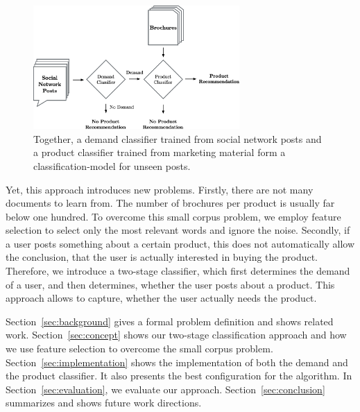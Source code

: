 \begin{figure}
	\begin{center}
		\includegraphics[width=0.7\textwidth]{figures/nto_workflow.eps}
	\end{center}
	\caption{Together, a demand classifier trained from social network posts and a product classifier trained from marketing material form a classification-model for unseen posts.}
	\label{fig:figureone}
\end{figure}

Yet, this approach introduces new problems.
Firstly, there are not many documents to learn from.
The number of brochures per product is usually far below one hundred.
To overcome this small corpus problem, we employ feature selection to select only the most relevant words and ignore the noise.
Secondly, if a user posts something about a certain product, this does not automatically allow the conclusion, that the user is actually interested in buying the product.
Therefore, we introduce a two-stage classifier, which first determines the demand of a user, and then determines, whether the user posts about a product.
This approach allows to capture, whether the user actually needs the product.

Section~\ref{sec:background} gives a formal problem definition and shows related work.
Section~\ref{sec:concept} shows our two-stage classification approach and how we use feature selection to overcome the small corpus problem.
Section~\ref{sec:implementation} shows the implementation of both the demand and the product classifier.
It also presents the best configuration for the algorithm.
In Section~\ref{sec:evaluation}, we evaluate our approach.
Section~\ref{sec:conclusion} summarizes and shows future work directions.
